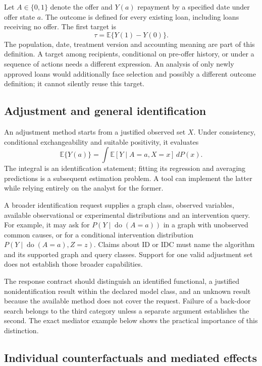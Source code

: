 Let $A\in\{0,1\}$ denote the offer and $Y(a)$ repayment by a specified date
under offer state $a$. The outcome is defined for every existing loan, including
loans receiving no offer. The first target is
\[
 \tau=\mathbb E\{Y(1)-Y(0)\}.
\]
The population, date, treatment version and accounting meaning are part of
this definition. A target among recipients, conditional on pre-offer history,
or under a sequence of actions needs a different expression. An analysis of
only newly approved loans would additionally face selection and possibly a
different outcome definition; it cannot silently reuse this target.

\subsection{Adjustment and general identification}

An adjustment method starts from a justified observed set $X$. Under consistency,
conditional exchangeability and suitable positivity, it evaluates
\[
 \mathbb E\{Y(a)\}
 =\int \mathbb E[Y\mid A=a,X=x]\,dP(x).
\]
The integral is an identification statement; fitting its regression and
averaging predictions is a subsequent estimation problem. A tool can implement
the latter while relying entirely on the analyst for the former.

A broader identification request supplies a graph class, observed variables,
available observational or experimental distributions and an intervention query.
For example, it may ask for $P(Y\mid\operatorname{do}(A=a))$ in a graph with
unobserved common causes, or for a conditional intervention distribution
$P(Y\mid\operatorname{do}(A=a),Z=z)$. Claims about ID or IDC must name the
algorithm and its supported graph and query classes. Support for one valid
adjustment set does not establish those broader capabilities.

The response contract should distinguish an identified functional, a justified
nonidentification result within the declared model class, and an unknown result
because the available method does not cover the request. Failure of a
back-door search belongs to the third category unless a separate argument
establishes the second. The exact mediator example below shows the practical
importance of this distinction.

\subsection{Individual counterfactuals and mediated effects}

